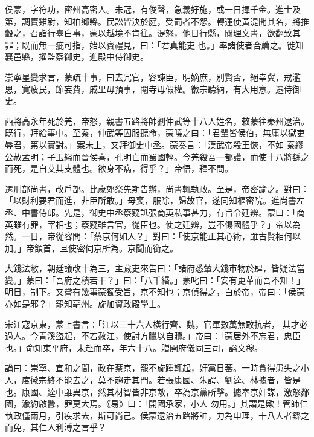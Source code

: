 \begin{pinyinscope}
 侯蒙，字符功，密州高密人。未冠，有俊聲，急義好施，或一日揮千金。進士及第，調寶雞尉，知柏鄉縣。民訟皆決於庭，受罰者不怨。轉運使黃湜聞其名，將推轂之，召詣行臺白事，蒙以越境不肯往。湜怒，他日行縣，閱理文書，欲翻致其罪；既而無一疵可指，始以賓禮見，曰：「君真能吏
 也。」率諸使者合薦之。徙知襄邑縣，擢監察御史，進殿中侍御史。



 崇寧星變求言，蒙疏十事，曰去冗官，容諫臣，明嫡庶，別賢否，絕幸冀，戒濫恩，寬疲民，節妄費，戚里毋預事，閹寺毋假權。徽宗聽納，有大用意。遷侍御史。



 西將高永年死於羌，帝怒，親書五路將帥劉仲武等十八人姓名，敕蒙往秦州逮治。既行，拜給事中。至秦，仲武等囚服聽命，蒙曉之曰：「君輩皆侯伯，無庸以獄吏辱君，第以實對。」案未上，又拜御史中丞。蒙奏言：「漢武帝殺王恢，不如
 秦繆公赦孟明；子玉縊而晉侯喜，孔明亡而蜀國輕。今羌殺吾一都護，而使十八將繇之而死，是自艾其支體也。欲身不病，得乎？」帝悟，釋不問。



 遷刑部尚書，改戶部。比歲郊祭先期告辦，尚書輒執政。至是，帝密諭之。對曰：「以財利要君而進，非臣所敢。」母喪，服除，歸故官，遂同知樞密院。進尚書左丞、中書侍郎。先是，御史中丞蔡薿詆張商英私事甚力，有旨令廷辨。蒙曰：「商英雖有罪，宰相也；蔡薿雖言官，從臣也。使之廷辨，豈不傷國體乎？」帝以為
 然。一日，帝從容問：「蔡京何如人？」對曰：「使京能正其心術，雖古賢相何以加。」帝頷首，且使密伺京所為。京聞而銜之。



 大錢法敝，朝廷議改十為三，主藏吏來告曰：「諸府悉輦大錢市物於肆，皆疑法當變。」蒙曰：「吾府之積若干？」曰：「八千緡。」蒙叱曰：「安有更革而吾不知！」明日，制下。又嘗有幾事蒙獨受旨，京不知也；京偵得之，白於帝，帝曰：「侯蒙亦如是邪？」罷知亳州。旋加資政殿學士。



 宋江寇京東，蒙上書言：「江以三十六人橫行齊、魏，官軍數萬無敢抗者，
 其才必過人。今青溪盜起，不若赦江，使討方臘以自贖。」帝曰：「蒙居外不忘君，忠臣也。」命知東平府，未赴而卒，年六十八。贈開府儀同三司，謚文穆。



 論曰：崇寧、宣和之間，政在蔡京，罷不旋踵輒起，奸黨日蕃。一時貪得患失之小人，度徽宗終不能去之，莫不趨走其門。若張康國、朱諤、劉逵、林攄者，皆是也。康國、逵中雖異京，然其材智皆非京敵，卒為京黨所擊。攄奉京奸謀，激怒鄰國，渝約啟釁，罪莫大焉。《易》曰：「開國承家，小人
 勿用。」其謂是歟！管師仁執政僅兩月，引疾求去，斯可尚己。侯蒙逮治五路將帥，力為申理，十八人者繇之而免，其仁人利溥之言乎？



\end{pinyinscope}